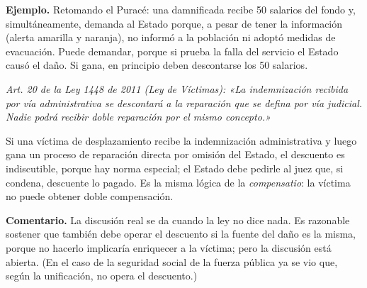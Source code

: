 \begin{ejemplo}
\textcolor[HTML]{4F6228}{\textbf{Ejemplo. }}Retomando el Puracé: una damnificada recibe 50 salarios del fondo y, simultáneamente, demanda al Estado porque, a pesar de tener la información (alerta amarilla y naranja), no informó a la población ni adoptó medidas de evacuación. Puede demandar, porque si prueba la falla del servicio el Estado causó el daño. Si gana, en principio deben descontarse los 50 salarios.
\end{ejemplo}
\begin{cita}
\textit{Art. 20 de la Ley 1448 de 2011 (Ley de Víctimas): «La indemnización recibida por vía administrativa se descontará a la reparación que se defina por vía judicial. Nadie podrá recibir doble reparación por el mismo concepto.»}
\end{cita}
Si una víctima de desplazamiento recibe la indemnización administrativa y luego gana un proceso de reparación directa por omisión del Estado, el descuento es indiscutible, porque hay norma especial; el Estado debe pedirle al juez que, si condena, descuente lo pagado. Es la misma lógica de la \textit{compensatio}: la víctima no puede obtener doble compensación.

\begin{comentario}
\textcolor[HTML]{8A6D3B}{\textbf{Comentario. }}La discusión real se da cuando la ley no dice nada. Es razonable sostener que también debe operar el descuento si la fuente del daño es la misma, porque no hacerlo implicaría enriquecer a la víctima; pero la discusión está abierta. (En el caso de la seguridad social de la fuerza pública ya se vio que, según la unificación, no opera el descuento.)
\end{comentario}
